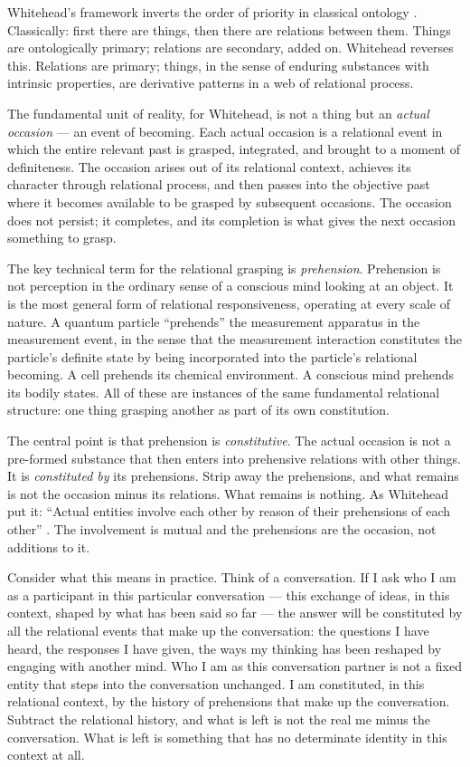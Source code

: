Whitehead's framework inverts the order of priority in classical ontology \citep{Whitehead1929}. Classically: first there are things, then there are relations between them. Things are ontologically primary; relations are secondary, added on. Whitehead reverses this. Relations are primary; things, in the sense of enduring substances with intrinsic properties, are derivative patterns in a web of relational process.

The fundamental unit of reality, for Whitehead, is not a thing but an \emph{actual occasion} --- an event of becoming. Each actual occasion is a relational event in which the entire relevant past is grasped, integrated, and brought to a moment of definiteness. The occasion arises out of its relational context, achieves its character through relational process, and then passes into the objective past where it becomes available to be grasped by subsequent occasions. The occasion does not persist; it completes, and its completion is what gives the next occasion something to grasp.

The key technical term for the relational grasping is \emph{prehension}. Prehension is not perception in the ordinary sense of a conscious mind looking at an object. It is the most general form of relational responsiveness, operating at every scale of nature. A quantum particle ``prehends'' the measurement apparatus in the measurement event, in the sense that the measurement interaction constitutes the particle's definite state by being incorporated into the particle's relational becoming. A cell prehends its chemical environment. A conscious mind prehends its bodily states. All of these are instances of the same fundamental relational structure: one thing grasping another as part of its own constitution.

The central point is that prehension is \emph{constitutive}. The actual occasion is not a pre-formed substance that then enters into prehensive relations with other things. It is \emph{constituted by} its prehensions. Strip away the prehensions, and what remains is not the occasion minus its relations. What remains is nothing. As Whitehead put it: ``Actual entities involve each other by reason of their prehensions of each other'' \citep{Whitehead1929}. The involvement is mutual and the prehensions are the occasion, not additions to it.

Consider what this means in practice. Think of a conversation. If I ask who I am as a participant in this particular conversation --- this exchange of ideas, in this context, shaped by what has been said so far --- the answer will be constituted by all the relational events that make up the conversation: the questions I have heard, the responses I have given, the ways my thinking has been reshaped by engaging with another mind. Who I am as this conversation partner is not a fixed entity that steps into the conversation unchanged. I am constituted, in this relational context, by the history of prehensions that make up the conversation. Subtract the relational history, and what is left is not the real me minus the conversation. What is left is something that has no determinate identity in this context at all.

